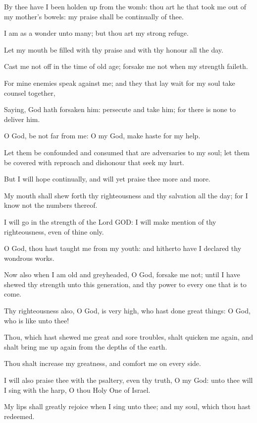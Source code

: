 \Verse By thee have I been holden up from the womb: thou art he that took me out of my mother's bowels: my praise shall be continually of thee.

\Verse I am as a wonder unto many; but thou art my strong refuge.

\Verse Let my mouth be filled with thy praise and with thy honour all the day.

\Verse Cast me not off in the time of old age; forsake me not when my strength faileth.

\Verse For mine enemies speak against me; and they that lay wait for my soul take counsel together,

\Verse Saying, God hath forsaken him: persecute and take him; for there is none to deliver him.

\Verse O God, be not far from me: O my God, make haste for my help.

\Verse Let them be confounded and consumed that are adversaries to my soul; let them be covered with reproach and dishonour that seek my hurt.

\Verse But I will hope continually, and will yet praise thee more and more.

\Verse My mouth shall shew forth thy righteousness and thy salvation all the day; for I know not the numbers thereof.

\Verse I will go in the strength of the Lord GOD: I will make mention of thy righteousness, even of thine only.

\Verse O God, thou hast taught me from my youth: and hitherto have I declared thy wondrous works.

\Verse Now also when I am old and greyheaded, O God, forsake me not; until I have shewed thy strength unto this generation, and thy power to every one that is to come.

\Verse Thy righteousness also, O God, is very high, who hast done great things: O God, who is like unto thee!

\Verse Thou, which hast shewed me great and sore troubles, shalt quicken me again, and shalt bring me up again from the depths of the earth.

\Verse Thou shalt increase my greatness, and comfort me on every side.

\Verse I will also praise thee with the psaltery, even thy truth, O my God: unto thee will I sing with the harp, O thou Holy One of Israel.

\Verse My lips shall greatly rejoice when I sing unto thee; and my soul, which thou hast redeemed.

